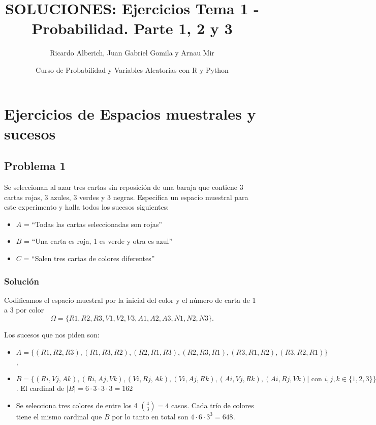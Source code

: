 \documentclass[
]{article}
\title{SOLUCIONES: Ejercicios Tema 1 - Probabilidad. Parte 1, 2 y 3}
\author{Ricardo Alberich, Juan Gabriel Gomila y Arnau Mir}
\date{Curso de Probabilidad y Variables Aleatorias con R y Python}
\providecommand{\tightlist}{%
  \setlength{\itemsep}{0pt}\setlength{\parskip}{0pt}}
\begin{document}
\maketitle

{
\hypersetup{linkcolor=blue}
\setcounter{tocdepth}{3}
\tableofcontents
}
\hypertarget{ejercicios-de-espacios-muestrales-y-sucesos}{%
\section{Ejercicios de Espacios muestrales y
sucesos}\label{ejercicios-de-espacios-muestrales-y-sucesos}}

\hypertarget{problema-1}{%
\subsection{Problema 1}\label{problema-1}}

Se seleccionan al azar tres cartas sin reposición de una baraja que
contiene 3 cartas rojas, 3 azules, 3 verdes y 3 negras. Especifica un
espacio muestral para este experimento y halla todos los sucesos
siguientes:

\begin{itemize}
\tightlist
\item
  \(A\) = ``Todas las cartas seleccionadas son rojas''
\item
  \(B\) = ``Una carta es roja, 1 es verde y otra es azul''
\item
  \(C\) = ``Salen tres cartas de colores diferentes''
\end{itemize}

\hypertarget{soluciuxf3n}{%
\subsubsection{Solución}\label{soluciuxf3n}}

Codificamos el espacio muestral por la inicial del color y el número de
carta de 1 a 3 por color
\[\Omega=\{R1, R2, R3, V1, V2, V3, A1, A2, A3, N1, N2, N3 \}.\]

Los sucesos que nos piden son:

\begin{itemize}
\tightlist
\item
  \(A=\{(R1, R2, R3),(R1, R3, R2),(R2, R1, R3),(R2, R3, R1),(R3, R1, R2), (R3, R2, R1)\}\),
\item
  \(B=\{(Ri,Vj,Ak),(Ri,Aj,Vk),(Vi,Rj,Ak),(Vi,Aj,Rk),(Ai,Vj,Rk),(Ai,Rj,Vk) | \mbox{ con } i,j,k\in\{1,2,3\}\}\).
  El cardinal de \(\left|B\right|=6\cdot 3\cdot 3\cdot 3= 162\)
\item
  Se selecciona tres colores de entre los 4 \({{4}\choose {3}}=4\)
  casos. Cada trío de colores tiene el mismo cardinal que \(B\) por lo
  tanto en total son \(4\cdot 6\cdot 3^3=648\).
\end{itemize}
\end{document}
